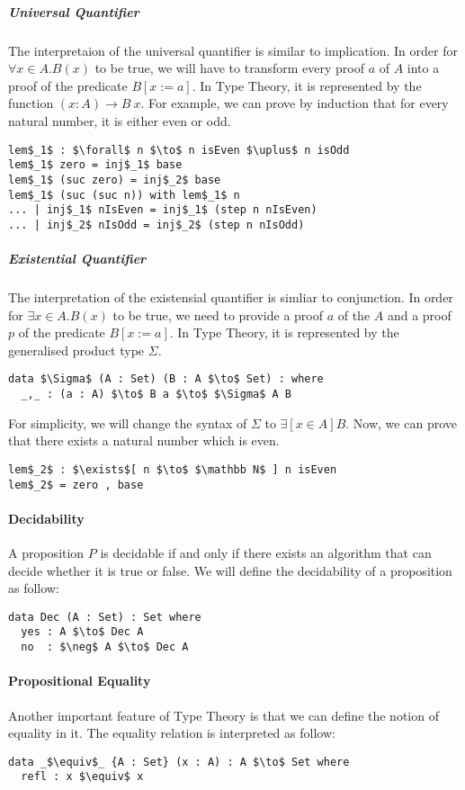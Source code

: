 \subparagraph{Universal Quantifier} The interpretaion of the universal quantifier is similar to
implication. In order for \(\forall x\in A. B(x)\) to be true, we will have
to transform every proof \(a\) of \(A\) into a proof of the predicate
\(B[x:=a]\). In Type Theory, it is represented by the function \((x :
A) \to B\ x\). For example, we can prove by induction that for every natural
number, it is either even or odd.
\begin{lstlisting}[mathescape=true,xleftmargin=.25\textwidth]
lem$_1$ : $\forall$ n $\to$ n isEven $\uplus$ n isOdd
lem$_1$ zero = inj$_1$ base
lem$_1$ (suc zero) = inj$_2$ base
lem$_1$ (suc (suc n)) with lem$_1$ n
... | inj$_1$ nIsEven = inj$_1$ (step n nIsEven)
... | inj$_2$ nIsOdd = inj$_2$ (step n nIsOdd)
\end{lstlisting} 

\subparagraph{Existential Quantifier} The interpretation of the
existensial quantifier is simliar to conjunction. In order for
\(\exists x\in A. B(x)\) to be true, we need to provide a proof
\(a\) of the \(A\) and a proof \(p\) of the predicate
\(B[x:=a]\). In Type Theory, it is represented by the generalised
product type \(\Sigma\). 
\begin{lstlisting}[mathescape=true,xleftmargin=.25\textwidth]
data $\Sigma$ (A : Set) (B : A $\to$ Set) : where
  _,_ : (a : A) $\to$ B a $\to$ $\Sigma$ A B
\end{lstlisting}
For simplicity, we will change the syntax of \(\Sigma\) to \(\exists [ x \in A ] B\). Now, we can prove that
there exists a natural number which is even. 
\begin{lstlisting}[mathescape=true,xleftmargin=.25\textwidth]
lem$_2$ : $\exists$[ n $\to$ $\mathbb N$ ] n isEven
lem$_2$ = zero , base
\end{lstlisting}


\paragraph{Decidability} A proposition \(P\) is decidable if and only if there
exists an algorithm that can decide whether it is true or false. We
will define the decidability of a proposition as follow:
\begin{lstlisting}[mathescape=true,xleftmargin=.25\textwidth]
data Dec (A : Set) : Set where
  yes : A $\to$ Dec A
  no  : $\neg$ A $\to$ Dec A
\end{lstlisting}


\paragraph{Propositional Equality} Another important feature of Type Theory is
that we can define the notion of equality in it. The
equality relation is interpreted as follow:
\begin{lstlisting}[mathescape=true,xleftmargin=.25\textwidth]
data _$\equiv$_ {A : Set} (x : A) : A $\to$ Set where
  refl : x $\equiv$ x
\end{lstlisting}
